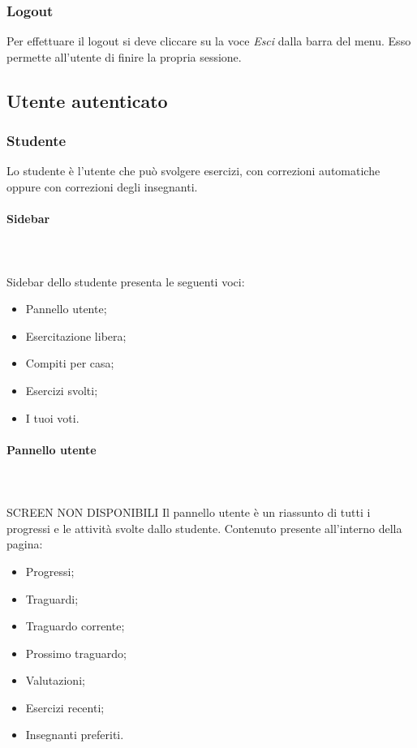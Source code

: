     \subsubsection{Logout}
    Per effettuare il {logout} si deve cliccare su la voce \textit{Esci} dalla barra del menu. Esso permette all'utente  di finire la propria sessione.


\subsection{Utente autenticato}

    \subsubsection{Studente}
      Lo studente è l'utente che può svolgere esercizi, con correzioni automatiche oppure con correzioni degli insegnanti.
        \paragraph{Sidebar} \mbox{}\\ \\
          Sidebar dello studente presenta le seguenti voci:
            \begin{itemize}
                \item Pannello utente;
                \item Esercitazione libera;
                \item Compiti per casa;
                \item Esercizi svolti;
                \item I tuoi voti.
            \end{itemize}
            
            
            
            
            
            
        \paragraph{Pannello utente}\mbox{}\\ \\
          SCREEN NON DISPONIBILI
          Il pannello utente è un riassunto di tutti i progressi e le attività svolte dallo studente.
          Contenuto presente all'interno della pagina:
        	\begin{itemize}
        		\item Progressi;
        		\item Traguardi;
        		\item Traguardo corrente;
        		\item Prossimo traguardo;
        		\item Valutazioni;
        		\item Esercizi recenti;
        		\item Insegnanti preferiti.
        	\end{itemize}
        
